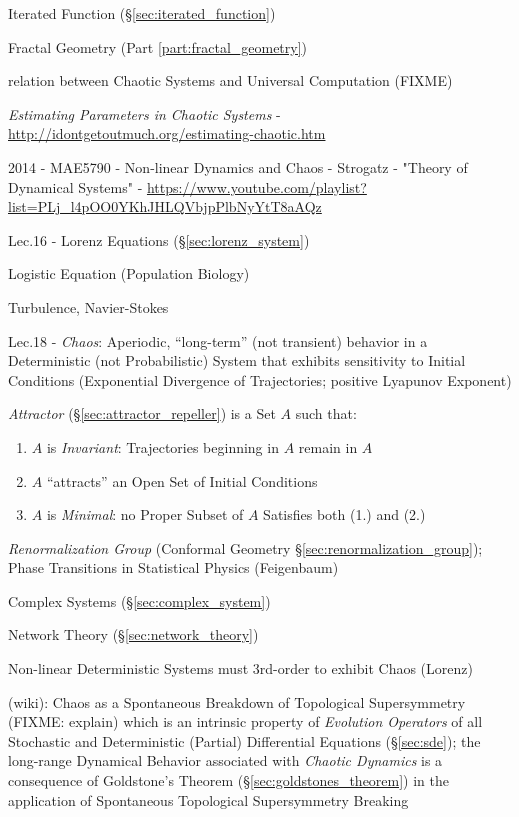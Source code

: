Iterated Function (\S\ref{sec:iterated_function})

Fractal Geometry (Part \ref{part:fractal_geometry})

relation between Chaotic Systems and Universal Computation (FIXME)

\emph{Estimating Parameters in Chaotic Systems} -
\url{http://idontgetoutmuch.org/estimating-chaotic.htm}

2014 - MAE5790 - Non-linear Dynamics and Chaos - Strogatz - "Theory of
Dynamical Systems" -
\url{https://www.youtube.com/playlist?list=PLj_l4pOO0YKhJHLQVbjpPlbNyYtT8aAQz}

Lec.16 - Lorenz Equations (\S\ref{sec:lorenz_system})

Logistic Equation (Population Biology)

Turbulence, Navier-Stokes

Lec.18 - \emph{Chaos}: Aperiodic, ``long-term'' (not transient) behavior in a
Deterministic (not Probabilistic) System that exhibits sensitivity to Initial
Conditions (Exponential Divergence of Trajectories; positive Lyapunov Exponent)

\emph{Attractor} (\S\ref{sec:attractor_repeller}) is a Set $A$ such that:
\begin{enumerate}
  \item $A$ is \emph{Invariant}: Trajectories beginning in $A$ remain in $A$
  \item $A$ ``attracts'' an Open Set of Initial Conditions
  \item $A$ is \emph{Minimal}: no Proper Subset of $A$ Satisfies both (1.) and
    (2.)
\end{enumerate}

\emph{Renormalization Group} (Conformal Geometry
\S\ref{sec:renormalization_group}); Phase Transitions in Statistical Physics
(Feigenbaum)

Complex Systems (\S\ref{sec:complex_system})

Network Theory (\S\ref{sec:network_theory})

Non-linear Deterministic Systems must 3rd-order to exhibit Chaos (Lorenz)

(wiki): Chaos as a Spontaneous Breakdown of Topological Supersymmetry (FIXME:
explain) which is an intrinsic property of \emph{Evolution Operators} of all
Stochastic and Deterministic (Partial) Differential Equations (\S\ref{sec:sde});
the long-range Dynamical Behavior associated with \emph{Chaotic Dynamics} is a
consequence of Goldstone's Theorem (\S\ref{sec:goldstones_theorem}) in the
application of Spontaneous Topological Supersymmetry Breaking

